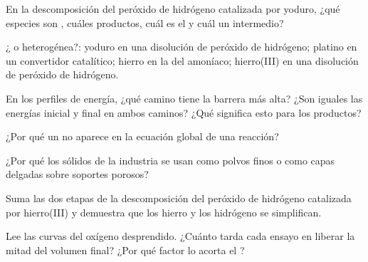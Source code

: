 \begin{exercise}[$\star$]\label{exo:g12:catalysis:1}
En la descomposición del peróxido de hidrógeno catalizada por 
yoduro, ¿qué especies son , cuáles productos, cuál es el
 y cuál un intermedio?
\end{exercise}

\begin{exercise}[$\star$]\label{exo:g12:catalysis:2}
¿ o heterogénea?:  yoduro en una disolución de
peróxido de hidrógeno; platino en un convertidor catalítico; hierro en la
 del amoníaco;  hierro(III) en una disolución de peróxido de
hidrógeno.
\end{exercise}

\begin{exercise}[$\star$]\label{exo:g12:catalysis:3}
En los perfiles de energía, ¿qué camino tiene la barrera más alta? ¿Son
iguales las energías inicial y final en ambos caminos? ¿Qué significa
esto para los productos?
\end{exercise}

\begin{exercise}[$\star$]\label{exo:g12:catalysis:4}
¿Por qué un  no aparece en la ecuación global de una reacción?
\end{exercise}

\begin{exercise}[$\star$]\label{exo:g12:catalysis:5}
¿Por qué los  sólidos de la industria se usan como polvos
finos o como capas delgadas sobre soportes porosos?
\end{exercise}

\begin{exercise}[$\star\star$]\label{exo:g12:catalysis:6}
Suma las dos etapas de la descomposición del peróxido de hidrógeno
catalizada por hierro(III) y demuestra que los  hierro y los 
hidrógeno se simplifican.
\end{exercise}

\begin{exercise}[$\star\star$]\label{exo:g12:catalysis:7}
Lee las curvas del oxígeno desprendido. ¿Cuánto tarda cada ensayo en
liberar la mitad del volumen final? ¿Por qué factor lo acorta el
?
\end{exercise}

